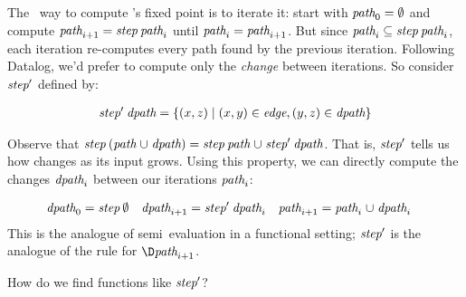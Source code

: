 \noindent
The \naive\ way to compute 's fixed point is to iterate it: start
with \(\text{\itshape path}_0 = \emptyset\) and compute \(\name{path}_{i+1} =
\name{step}\<\name{path}_i\) until \(\text{\itshape path}_i = \text{\itshape path}_{i+1}\).
%
But since $\name{path}_i \subseteq \name{step}\<\name{path}_i$, each iteration
re-computes every path found by the previous iteration.
%
Following Datalog, we'd prefer to compute only the \emph{change} between
iterations.
%
So consider $\text{\itshape step}'$ defined by:

\nopagebreak[2]
\[\begin{array}{l}
  \text{\itshape step}' \mskip 4mu plus 4mu minus 1mu\text{\itshape dpath} =
  \{(x,z) \mathrel{|} (x,y) \in \text{\itshape edge}, (y,z) \in \text{\itshape dpath}\}
\end{array}\]

\noindent
Observe that $\name{step} \<(\name{path} \cup \name{dpath}) =
\name{step}\<\name{path} \cup \name{step}'\<\name{dpath}$.
%
That is, $\text{\itshape step}'$ tells us how  changes as its input grows.
%
Using this property, we can directly compute the changes $\text{\itshape dpath}_i$
between our iterations $\text{\itshape path}_i$:

\begin{align*}
  \name{dpath}_0 &= \name{step}\<\emptyset
  & \name{dpath}_{i+1} &= \name{step}'\<\name{dpath}_i
  & \name{path}_{i+1} &= \name{path}_i \cup \name{dpath}_i
\end{align*}
%
%
This is the analogue of semi\naive\ evaluation in a functional setting;
$\text{\itshape step}'$ is the analogue of the rule for $\D\name{path}_{i+1}$.

\label{sec:derivatives-via-incremental}
How do we find functions like $\text{\itshape step}'$?
%





